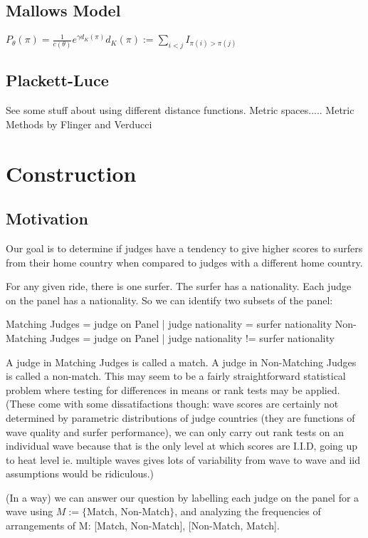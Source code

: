 \documentclass{article}
\theoremstyle{definition}
\begin{document}
\subsection{Mallows Model}
\(
P_\theta(\pi) = \frac{1}{ c(\theta) }e^{\gamma d_K(\pi)}
d_K(\pi):= \sum_{i<j} I_{\pi(i)>\pi(j)}
\)

\subsection{Plackett-Luce}
See some stuff about using different distance functions. Metric spaces.....
Metric Methods by Flinger and Verducci

\section{Construction}
\subsection{Motivation}
Our goal is to determine if judges have a tendency to give higher scores to surfers from their home country when compared to judges with a different home country.

For any given ride, there is one surfer. The surfer has a nationality. Each judge on the panel has a nationality. So we can identify two subsets of the panel:

Matching Judges = {judge on Panel | judge nationality = surfer nationality }
Non-Matching Judges = {judge on Panel | judge nationality != surfer nationality}

A judge in Matching Judges is called a match. A judge in Non-Matching Judges is called a non-match. This may seem to be a fairly straightforward statistical problem where testing for differences in means or rank tests may be applied. (These come with some dissatifactions though: wave scores are certainly not determined by parametric distributions of judge countries (they are functions of wave quality and surfer performance), we can only carry out rank tests on an individual wave because that is the only level at which scores are I.I.D, going up to heat level ie. multiple waves gives lots of variability from wave to wave and iid assumptions would be ridiculous.)

(In a way) we can answer our question by labelling each judge on the panel for a wave using $M :=\{$Match, Non-Match$\}$, and analyzing the frequencies of arrangements of M: [Match, Non-Match], [Non-Match, Match].
\end{document}
